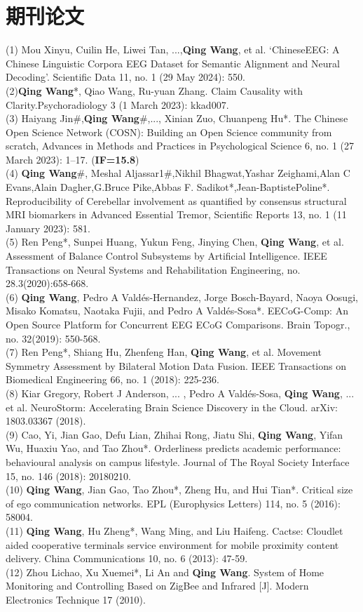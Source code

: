 \documentclass{resume}
\begin{document}
\section{期刊论文}
(1) Mou Xinyu, Cuilin He, Liwei Tan, ...,\textbf{Qing Wang}, et al. ‘ChineseEEG: A Chinese Linguistic Corpora EEG Dataset for Semantic Alignment and Neural Decoding’. Scientific Data 11, no. 1 (29 May 2024): 550. \\
(2)\textbf{Qing Wang}*, Qiao Wang, Ru-yuan Zhang. Claim Causality with Clarity.Psychoradiology 3 (1 March 2023): kkad007. \\
(3) Haiyang Jin\#,\textbf{Qing Wang}\#,..., Xinian Zuo, Chuanpeng Hu*. The Chinese Open Science Network (COSN): Building an Open Science community from scratch, Advances in Methods and Practices in Psychological Science 6, no. 1 (27 March 2023): 1–17. (\textbf{IF=15.8})\\
(4) \textbf{Qing Wang}\#, Meshal Aljassar1\#,Nikhil Bhagwat,Yashar Zeighami,Alan C Evans,Alain Dagher,G.Bruce Pike,Abbas F. Sadikot*,Jean-BaptistePoline*. Reproducibility of Cerebellar involvement as quantified by consensus structural MRI biomarkers in Advanced Essential Tremor, Scientific Reports 13, no. 1 (11 January 2023): 581.\\
(5) Ren Peng*, Sunpei Huang, Yukun Feng, Jinying Chen, \textbf{Qing Wang}, et al. Assessment of Balance Control Subsystems by Artificial Intelligence. IEEE Transactions on Neural Systems and Rehabilitation Engineering, no. 28.3(2020):658-668.\\
(6) \textbf{Qing Wang}, Pedro A Vald{\'e}s-Hernandez, Jorge Bosch-Bayard, Naoya Oosugi, Misako Komatsu, Naotaka Fujii, and Pedro A Vald{\'e}s-Sosa*. EECoG-Comp: An Open Source Platform for Concurrent EEG ECoG Comparisons. Brain Topogr., no. 32(2019): 550-568.\\
(7) Ren Peng*, Shiang Hu, Zhenfeng Han, \textbf{Qing Wang}, et al. Movement Symmetry Assessment by Bilateral Motion Data Fusion. IEEE Transactions on Biomedical Engineering 66, no. 1 (2018): 225-236.\\
(8) Kiar Gregory, Robert J Anderson, ... , Pedro A Vald{\'e}s-Sosa, \textbf{Qing Wang}, ... et al. NeuroStorm: Accelerating Brain Science Discovery in the Cloud. arXiv: 1803.03367 (2018). \\
(9) Cao, Yi, Jian Gao, Defu Lian, Zhihai Rong, Jiatu Shi, \textbf{Qing Wang}, Yifan Wu, Huaxiu Yao, and Tao Zhou*. Orderliness predicts academic performance: behavioural analysis on campus lifestyle. Journal of The Royal Society Interface 15, no. 146 (2018): 20180210.\\
(10) \textbf{Qing Wang}, Jian Gao, Tao Zhou*, Zheng Hu, and Hui Tian*. Critical size of ego communication networks. EPL (Europhysics Letters) 114, no. 5 (2016): 58004.\\
(11) \textbf{Qing Wang}, Hu Zheng*, Wang Ming, and Liu Haifeng. Cactse: Cloudlet aided cooperative terminals service environment for mobile proximity content delivery. China Communications 10, no. 6 (2013): 47-59.\\
(12) Zhou Lichao, Xu Xuemei*, Li An and \textbf{Qing Wang}. System of Home Monitoring and Controlling Based on ZigBee and Infrared [J]. Modern Electronics Technique 17 (2010).\\
\end{document}
